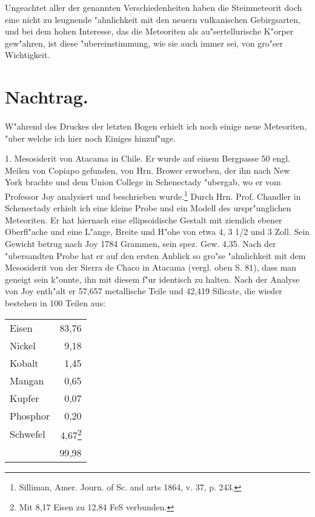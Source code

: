 \documentclass[a4paper, 11pt, oneside]{article}
\begin{document}
Ungeachtet aller der genannten Verschiedenheiten haben die Steinmeteorit doch eine nicht zu leugnende "ahnlichkeit mit den neuern vulkanischen Gebirgsarten, und bei dem hohen Interesse, das die Meteoriten als au"sertellurische K"orper gew"ahren, ist diese "ubereinstimmung, wie sie auch immer sei, von gro"ser Wichtigkeit.
\clearpage
\section{Nachtrag.}
\paragraph{}
W"ahrend des Druckes der letzten Bogen erhielt ich noch einige neue Meteoriten, "uber welche ich hier noch Einiges hinzuf"uge.

1. Mesosiderit von Atacama in Chile. Er wurde auf einem Bergpasse 50 engl. Meilen von Copiapo gefunden, von Hrn. Brower erworben, der ihn nach New York brachte und dem Union College in Schenectady "ubergab, wo er vom Professor Joy analysiert und beschrieben wurde.\footnote{Silliman, Amer. Journ. of Sc. and arts 1864, v. 37, p. 243.} Durch Hrn. Prof. Chandler in Schenectady erhielt ich eine kleine Probe und ein Modell des urspr"unglichen Meteoriten. Er hat hiernach eine ellipsoidische Gestalt mit ziemlich ebener Oberfl"ache und eine L"ange, Breite und H"ohe von etwa 4, 3 1/2 und 3 Zoll. Sein Gewicht betrug nach Joy 1784 Grammen, sein spez. Gew. 4,35. Nach der "ubersandten Probe hat er auf den ersten Anblick so gro"se "ahnlichkeit mit dem Mesosiderit von der Sierra de Chaco in Atacama (vergl. oben S. 81), dass man geneigt sein k"onnte, ihn mit diesem f"ur identisch zu halten. Nach der Analyse von Joy enth"alt er 57,657 metallische Teile und 42,419 Silicate, die wieder bestehen in 100 Teilen aus:
\begin{center}
\begin{tabular}{ l r }
    Eisen & 83,76\\
    Nickel & 9,18\\
    Kobalt & 1,45\\
    Mangan & 0,65\\
    Kupfer & 0,07\\
    Phosphor & 0,20\\
    Schwefel & 4,67\footnote{Mit 8,17 Eisen zu 12,84 FeS verbunden.}\\
     & 99,98\\
\end{tabular}
\end{center}
\end{document}
